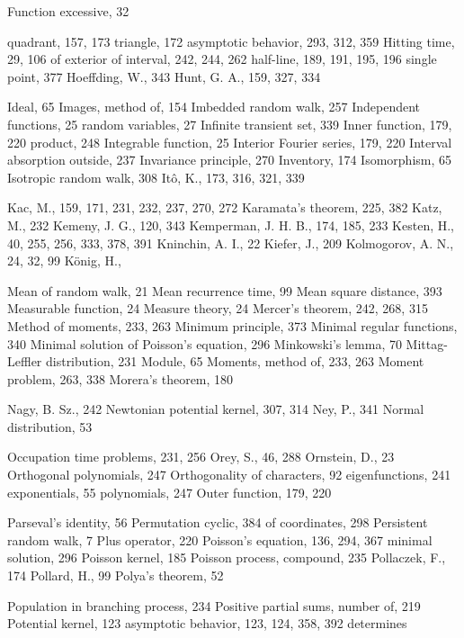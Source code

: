 Function excessive, 32

quadrant, 157, 173
triangle, 172
asymptotic behavior, 293, 312, 359
Hitting time, 29, 106
of exterior of interval, 242, 244, 262
half-line, 189, 191, 195, 196
single point, 377
Hoeffding, W., 343
Hunt, G. A., 159, 327, 334

Ideal, 65
Images, method of, 154
Imbedded random walk, 257
Independent functions, 25
random variables, 27
Infinite transient set, 339
Inner function, 179, 220
product, 248
Integrable function, 25
Interior Fourier series, 179, 220
Interval absorption outside, 237
Invariance principle, 270
Inventory, 174
Isomorphism, 65
Isotropic random walk, 308
Itô, K., 173, 316, 321, 339

Kac, M., 159, 171, 231, 232, 237, 270, 272
Karamata's theorem, 225, 382
Katz, M., 232
Kemeny, J. G., 120, 343
Kemperman, J. H. B., 174, 185, 233
Kesten, H., 40, 255, 256, 333, 378, 391
Kninchin, A. I., 22
Kiefer, J., 209
Kolmogorov, A. N., 24, 32, 99
König, H.,

Mean of random walk, 21
Mean recurrence time, 99
Mean square distance, 393
Measurable function, 24
Measure theory, 24
Mercer's theorem, 242, 268, 315
Method of moments, 233, 263
Minimum principle, 373
Minimal regular functions, 340
Minimal solution of Poisson's equation, 296
Minkowski's lemma, 70
Mittag-Leffler distribution, 231
Module, 65
Moments, method of, 233, 263
Moment problem, 263, 338
Morera's theorem, 180

Nagy, B. Sz., 242
Newtonian potential kernel, 307, 314
Ney, P., 341
Normal distribution, 53

Occupation time problems, 231, 256
Orey, S., 46, 288
Ornstein, D., 23
Orthogonal polynomials, 247
Orthogonality of characters, 92
eigenfunctions, 241
exponentials, 55
polynomials, 247
Outer function, 179, 220

Parseval's identity, 56
Permutation cyclic, 384 of coordinates, 298
Persistent random walk, 7
Plus operator, 220
Poisson's equation, 136, 294, 367 minimal solution, 296
Poisson kernel, 185
Poisson process, compound, 235
Pollaczek, F., 174
Pollard, H., 99
Polya's theorem, 52

Population in branching process, 234
Positive partial sums, number of, 219
Potential kernel, 123 asymptotic behavior, 123, 124, 358, 392 determines

